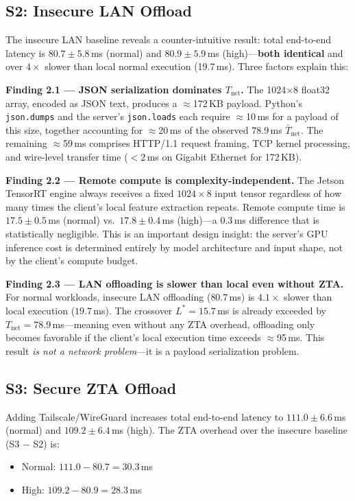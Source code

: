 \documentclass[10pt,twocolumn]{article}
\begin{document}
\subsection{S2: Insecure LAN Offload}

The insecure LAN baseline reveals a counter-intuitive result: total
end-to-end latency is $80.7 \pm 5.8$\,ms (normal) and $80.9 \pm 5.9$\,ms
(high)—\textbf{both identical} and over $4\times$ slower than local normal
execution (19.7\,ms).  Three factors explain this:

\textbf{Finding 2.1 — JSON serialization dominates $T_{\text{net}}$.}
The 1024$\times$8 float32 array, encoded as JSON text, produces a
$\approx$172\,KB payload.  Python's \texttt{json.dumps} and the server's
\texttt{json.loads} each require $\approx$10\,ms for a payload of this size,
together accounting for $\approx$20\,ms of the observed 78.9\,ms
$\bar{T}_{\text{net}}$.  The remaining $\approx$59\,ms comprises HTTP/1.1
request framing, TCP kernel processing, and wire-level transfer time
($<$2\,ms on Gigabit Ethernet for 172\,KB).

\textbf{Finding 2.2 — Remote compute is complexity-independent.}
The Jetson TensorRT engine always receives a fixed $1024 \times 8$ input
tensor regardless of how many times the client's local feature extraction
repeats.  Remote compute time is $17.5 \pm 0.5$\,ms (normal) vs.\
$17.8 \pm 0.4$\,ms (high)—a $0.3$\,ms difference that is statistically
negligible.  This is an important design insight: the server's GPU inference
cost is determined entirely by model architecture and input shape, not by the
client's compute budget.

\textbf{Finding 2.3 — LAN offloading is slower than local even without ZTA.}
For normal workloads, insecure LAN offloading ($80.7$\,ms) is $4.1\times$
slower than local execution ($19.7$\,ms).  The crossover
$L^* = 15.7$\,ms is already exceeded by $T_{\text{net}} = 78.9$\,ms—meaning
even without any ZTA overhead, offloading only becomes favorable if the
client's local execution time exceeds $\approx$95\,ms.  This result
\emph{is not a network problem}—it is a payload serialization problem.

\subsection{S3: Secure ZTA Offload}

Adding Tailscale/WireGuard increases total end-to-end latency to
$111.0 \pm 6.6$\,ms (normal) and $109.2 \pm 6.4$\,ms (high).  The ZTA
overhead over the insecure baseline (S3 $-$ S2) is:
\begin{itemize}[noitemsep]
    \item Normal: $111.0 - 80.7 = \mathbf{30.3}$\,ms
    \item High: $109.2 - 80.9 = \mathbf{28.3}$\,ms
\end{itemize}
\end{document}
